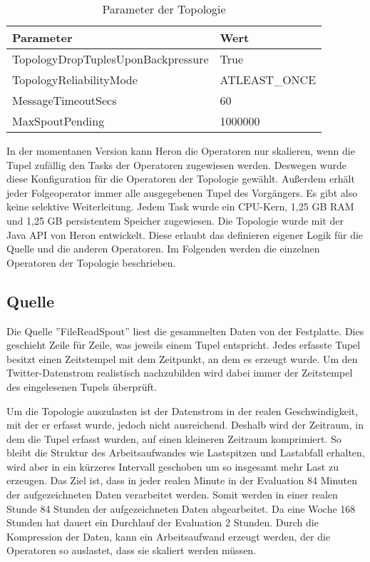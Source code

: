 \begin{table}
\caption{Parameter der Topologie}
\begin{tabular}{ll}
\hline
\textbf{Parameter} & \textbf{Wert} \\ \hline
TopologyDropTuplesUponBackpressure & True \\
TopologyReliabilityMode & ATLEAST\_ONCE \\
MessageTimeoutSecs & 60 \\
MaxSpoutPending & 1000000 \\
\hline
\end{tabular}
\end{table}

In der momentanen Version kann Heron die Operatoren nur skalieren, wenn die Tupel zufällig den Tasks der Operatoren zugewiesen werden.
Deswegen wurde diese Konfiguration für die Operatoren der Topologie gewählt.
Außerdem erhält jeder Folgeoperator immer alle ausgegebenen Tupel des Vorgängers.
Es gibt also keine selektive Weiterleitung.
Jedem Task wurde ein CPU-Kern, 1,25 GB RAM und 1,25 GB persistentem Speicher zugewiesen.
Die Topologie wurde mit der Java API von Heron entwickelt.
Diese erlaubt das definieren eigener Logik für die Quelle und die anderen Operatoren.
Im Folgenden werden die einzelnen Operatoren der Topologie beschrieben.

\subsection{Quelle}
Die Quelle ''FileReadSpout'' liest die gesammelten Daten von der Festplatte.
Dies geschieht Zeile für Zeile, was jeweils einem Tupel entspricht.
Jedes erfasste Tupel besitzt einen Zeitstempel mit dem Zeitpunkt, an dem es erzeugt wurde.
Um den Twitter-Datenstrom realistisch nachzubilden wird dabei immer der Zeitstempel des eingelesenen Tupels überprüft.

Um die Topologie auszulasten ist der Datenstrom in der realen Geschwindigkeit, mit der er erfasst wurde, jedoch nicht ausreichend.
Deshalb wird der Zeitraum, in dem die Tupel erfasst wurden, auf einen kleineren Zeitraum komprimiert.
So bleibt die Struktur des Arbeitsaufwandes wie Lastspitzen und Lastabfall erhalten, wird aber in ein kürzeres Intervall geschoben um so insgesamt mehr Last zu erzeugen.
Das Ziel ist, dass in jeder realen Minute in der Evaluation 84 Minuten der aufgezeichneten Daten verarbeitet werden.
Somit werden in einer realen Stunde 84 Stunden der aufgezeichneten Daten abgearbeitet.
Da eine Woche 168 Stunden hat dauert ein Durchlauf der Evaluation 2 Stunden.
Durch die Kompression der Daten, kann ein Arbeitsaufwand erzeugt werden, der die Operatoren so auslastet, dass sie skaliert werden müssen.

